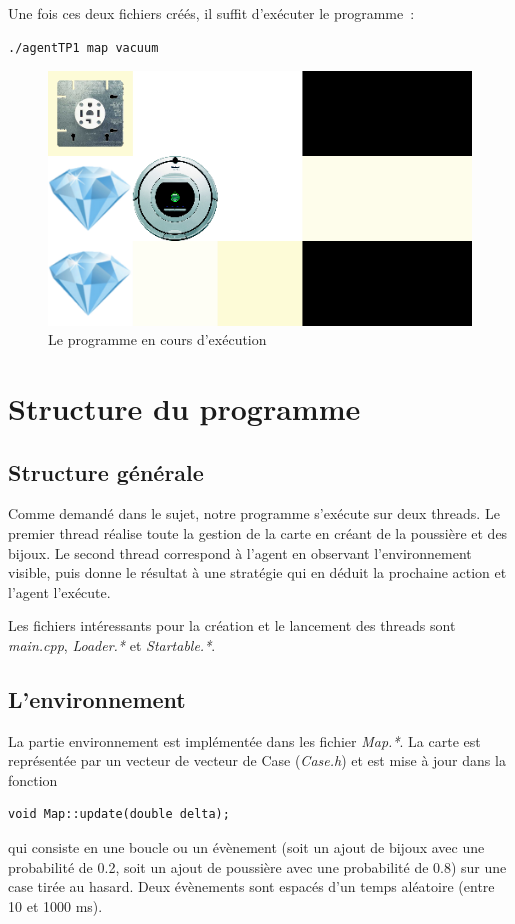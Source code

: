 \documentclass{article}
\begin{document}
Une fois ces deux fichiers créés, il suffit d'exécuter le programme~:
\begin{verbatim}
./agentTP1 map vacuum
\end{verbatim}

\begin{figure}[h]
	\begin{center}
		\includegraphics[scale=0.4]{execution}
		\caption{Le programme en cours d'exécution}
		\label{fig:Execution}
	\end{center}
\end{figure}

\section{Structure du programme}
\subsection{Structure générale}
Comme demandé dans le sujet, notre programme s'exécute sur deux threads. Le premier thread réalise toute la gestion de la carte en créant de la poussière et des bijoux. Le second thread correspond à l'agent en observant l'environnement visible, puis donne le résultat à une stratégie qui en déduit la prochaine action et l'agent l'exécute.

Les fichiers intéressants pour la création et le lancement des threads sont \emph{main.cpp}, \emph{Loader.*} et \emph{Startable.*}.
\subsection{L'environnement}
La partie environnement est implémentée dans les fichier \emph{Map.*}. La carte est représentée par un vecteur de vecteur de Case (\emph{Case.h}) et est mise à jour dans la fonction \begin{verbatim}
void Map::update(double delta);
\end{verbatim}
qui consiste en une boucle ou un évènement (soit un ajout de bijoux avec une probabilité de 0.2, soit un ajout de poussière avec une probabilité de 0.8) sur une case tirée au hasard. Deux évènements sont espacés d'un temps aléatoire (entre 10 et 1000 ms).
\end{document}
